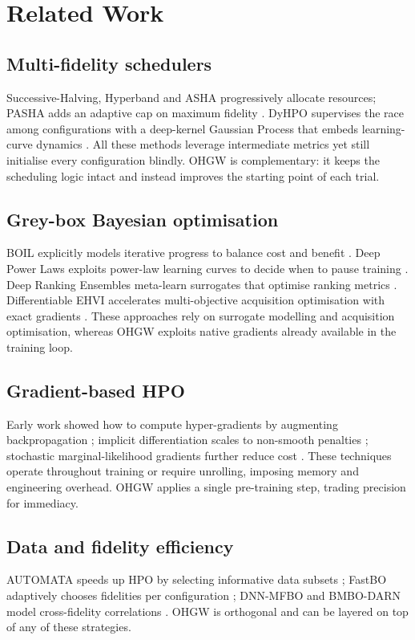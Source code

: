 \documentclass{article}
\begin{document}
\section{Related Work}
\subsection{Multi-fidelity schedulers}
Successive-Halving, Hyperband and ASHA progressively allocate resources; PASHA adds an adaptive cap on maximum fidelity \cite{bohdal-2022-pasha}. DyHPO supervises the race among configurations with a deep-kernel Gaussian Process that embeds learning-curve dynamics \cite{wistuba-2022-supervising}. All these methods leverage intermediate metrics yet still initialise every configuration blindly. OHGW is complementary: it keeps the scheduling logic intact and instead improves the starting point of each trial.

\subsection{Grey-box Bayesian optimisation}
BOIL explicitly models iterative progress to balance cost and benefit \cite{nguyen-2019-bayesian}. Deep Power Laws exploits power-law learning curves to decide when to pause training \cite{kadra-2023-scaling}. Deep Ranking Ensembles meta-learn surrogates that optimise ranking metrics \cite{khazi-2023-deep}. Differentiable EHVI accelerates multi-objective acquisition optimisation with exact gradients \cite{daulton-2020-differentiable}. These approaches rely on surrogate modelling and acquisition optimisation, whereas OHGW exploits native gradients already available in the training loop.

\subsection{Gradient-based HPO}
Early work showed how to compute hyper-gradients by augmenting backpropagation \cite{chandra-2019-gradient}; implicit differentiation scales to non-smooth penalties \cite{bertrand-2020-implicit}; stochastic marginal-likelihood gradients further reduce cost \cite{immer-2023-stochastic}. These techniques operate throughout training or require unrolling, imposing memory and engineering overhead. OHGW applies a single pre-training step, trading precision for immediacy.

\subsection{Data and fidelity efficiency}
AUTOMATA speeds up HPO by selecting informative data subsets \cite{killamsetty-2022-automata}; FastBO adaptively chooses fidelities per configuration \cite{jiang-2024-efficient}; DNN-MFBO and BMBO-DARN model cross-fidelity correlations \cite{li-2020-multi,li-2021-batch}. OHGW is orthogonal and can be layered on top of any of these strategies.
\end{document}
